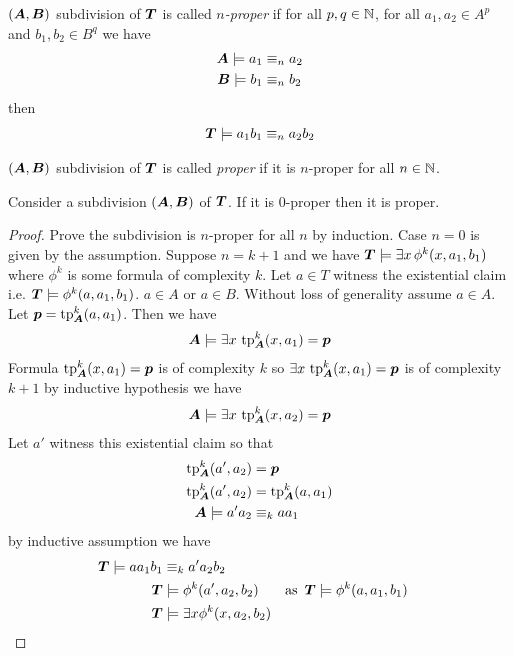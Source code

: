 \documentclass{amsart}
\DeclareMathOperator{\TT}{\boldface T}
\DeclareMathOperator{\A}{\boldface A}
\DeclareMathOperator{\B}{\boldface B}
\begin{document}
\begin{Definition}
	$(\A, \B)$ subdivision of $\TT$ is called \emph{$n$-proper} if for all $p,q \in \mathbb{N}$, for all $a_1, a_2 \in A^p$ and $b_1, b_2 \in B^q$ we have
	\begin{align*}
		\A \models a_1 &\equiv_n a_2 \\
		\B \models b_1 &\equiv_n b_2
	\end{align*}
	then
	\begin{align*}
		\TT \models a_1b_1 \equiv_n a_2b_2
	\end{align*}
\end{Definition}

\begin{Definition}
	$(\A, \B)$ subdivision of $\TT$ is called \emph{proper} if it is $n$-proper for all $n \in \mathbb{N}$.
\end{Definition}

\begin{Lemma} \label{lm_subdivision}
	Consider a subdivision $(\A, \B)$ of $\TT$. If it is $0$-proper then it is proper.
\end{Lemma}

\begin{proof}
	Prove the subdivision is $n$-proper for all $n$ by induction. Case $n = 0$ is given by the assumption. Suppose $n = k + 1$ and we have $\TT \models \exists x \, \phi^k(x, a_1, b_1)$ where $\phi^k$ is some formula of complexity $k$. Let $a \in T$ witness the existential claim i.e. $\TT \models \phi^k(a, a_1, b_1)$. $a \in A$ or $a \in B$. Without loss of generality assume $a \in A$. Let $\pp = \tp^k_{\A} (a, a_1)$. Then we have 
	\begin{align*}
		\A \models \exists x \, \tp^k_{\A}(x, a_1) = \pp
	\end{align*}
	Formula $\tp^k_{\A}(x, a_1) = \pp$ is of complexity $k$ so $\exists x \, \tp^k_{\A}(x, a_1) = \pp$ is of complexity $k+1$ by inductive hypothesis we have
	\begin{align*}
		\A \models \exists x \, \tp^k_{\A}(x, a_2) = \pp
	\end{align*}
	Let $a'$ witness this existential claim so that  
	\begin{align*}
		\tp^k_{\A}(a', a_2) &= \pp \\
		\tp^k_{\A}(a', a_2) &= \tp^k_{\A}(a, a_1) \\
		\A \models a'a_2 &\equiv_k aa_1
	\end{align*}
	by inductive assumption we have
	\begin{align*}
		\TT \models aa_1b_1 &\equiv_k a'a_2b_2 \\
		\TT &\models \phi^k(a', a_2, b_2) & \text {as } \TT &\models \phi^k(a, a_1, b_1)\\
		\TT &\models \exists x \phi^k(x, a_2, b_2)
	\end{align*}
\end{proof}
\end{document}
